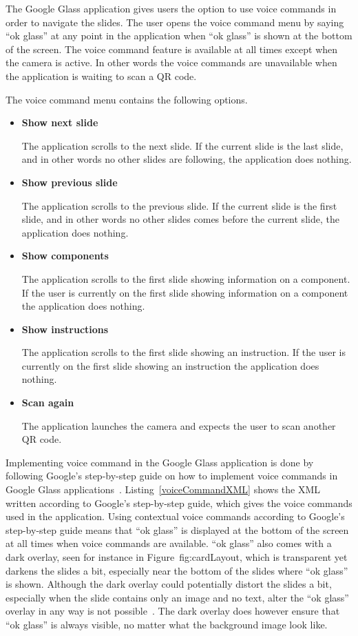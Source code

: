 The Google Glass application gives users the option to use voice commands in order to navigate the slides. The user opens the voice command menu by saying ``ok glass'' at any point in the application when ``ok glass'' is shown at the bottom of the screen. The voice command feature is available at all times except when the camera is active. In other words the voice commands are unavailable when the application is waiting to scan a QR code.

The voice command menu contains the following options.

\begin{itemize}
	\item \textbf{Show next slide}
	
	The application scrolls to the next slide. If the current slide is the last slide, and in other words no other slides are following, the application does nothing.
	\item \textbf{Show previous slide}
	
	The application scrolls to the previous slide. If the current slide is the first slide, and in other words no other slides comes before the current slide, the application does nothing.
	\item \textbf{Show components}
	
	The application scrolls to the first slide showing information on a component. If the user is currently on the first slide showing information on a component the application does nothing. 
	\item \textbf{Show instructions}
	
	The application scrolls to the first slide showing an instruction. If the user is currently on the first slide showing an instruction the application does nothing.
	\item \textbf{Scan again}
	
	The application launches the camera and expects the user to scan another QR code.
\end{itemize}

Implementing voice command in the Google Glass application is done by following Google's step-by-step guide on how to implement voice commands in Google Glass applications~\cite{howToVoiceInput}. Listing~\ref{voiceCommandXML} shows the XML written according to Google's step-by-step guide, which gives the voice commands used in the application. Using contextual voice commands according to Google's step-by-step guide means that ``ok glass'' is displayed at the bottom of the screen at all times when voice commands are available. ``ok glass'' also comes with a dark overlay, seen for instance in Figure~{fig:cardLayout}, which is transparent yet darkens the slides a bit, especially near the bottom of the slides where ``ok glass'' is shown. Although the dark overlay could potentially distort the slides a bit, especially when the slide contains only an image and no text, alter the ``ok glass'' overlay in any way is not possible~\cite{voiceCommandCustom1, voiceCommandCustom2}. The dark overlay does however ensure that ``ok glass'' is always visible, no matter what the background image look like.

